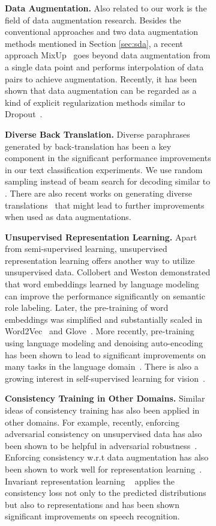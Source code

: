 \documentclass{article}
\begin{document}
\begin{figure}[ht]
\begin{subfigure}{.19\textwidth}
{\textbf{Data Augmentation.} Also related to our work is the field of data augmentation research.
Besides the conventional approaches and two data augmentation methods mentioned in Section \ref{sec:sda}, a recent approach MixUp~\cite{zhang2017mixup} goes beyond data augmentation from a single data point and performs interpolation of data pairs to achieve augmentation. Recently,  it has been shown that data augmentation can be regarded as a kind of explicit regularization methods similar to Dropout~\cite{hernandez2018data}. 

\textbf{Diverse Back Translation.} Diverse paraphrases generated by back-translation has been a key component in the significant performance improvements in our text classification experiments. We use random sampling instead of beam search for decoding similar to \cite{edunov2018understanding}. There are also recent works on generating diverse translations~\cite{he2018sequence, shen2019mixture, kool2019stochastic} that might lead to further improvements when used as data augmentations.


\textbf{Unsupervised Representation Learning.} Apart from semi-supervised learning, unsupervised representation learning offers another way to utilize unsupervised data. 
Collobert and Weston \cite{collobert2008unified} demonstrated that word embeddings learned by language modeling can improve the performance significantly on semantic role labeling.
Later, the pre-training of word embeddings was simplified and substantially scaled in Word2Vec~\cite{mikolov2013distributed} and Glove~\cite{pennington2014glove}.
More recently,  pre-training using language modeling and denoising auto-encoding has been shown to lead to significant improvements on many tasks in the language domain~\cite{dai2015semi,peters2018deep, radford2018improving,howard2018universal,devlin2018bert}. There is also a growing interest in self-supervised learning for vision~\cite{zhai2019s, henaff2019data, trinh2019selfie}.  

\textbf{Consistency Training in Other Domains.} Similar ideas of consistency training has also been applied in other domains. For example, recently, enforcing adversarial consistency on unsupervised data has also been shown to be helpful in adversarial robustness~\cite{stanforth2019labels,  zhai2019adversarially, najafi2019robustness, carmon2019unlabeled}.
Enforcing consistency w.r.t data augmentation has also been shown to work well for representation learning~\cite{hu2017learning, ye2019unsupervised}. Invariant representation learning ~\cite{liang2018learning,Salazar2018Invariant} applies the consistency loss not only to the predicted distributions but also to representations and has been shown significant improvements on speech recognition. 



}
\end{subfigure}
\end{figure}
\end{document}
